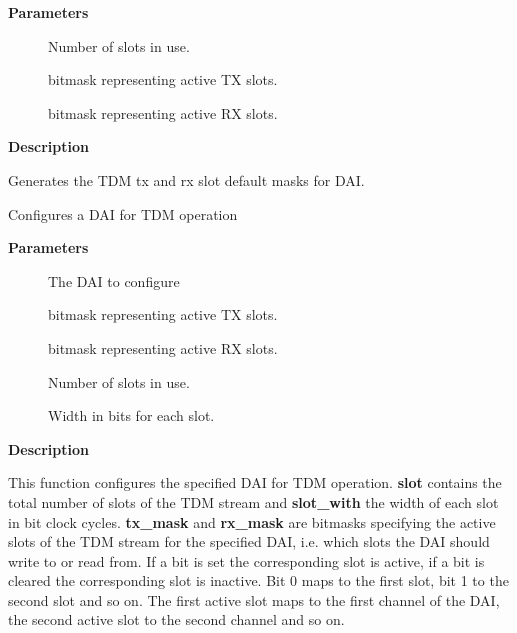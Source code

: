 \documentclass[a4paper,8pt,english]{sphinxmanual}
\begin{document}
\textbf{Parameters}
\begin{description}
\item[{}] \leavevmode
Number of slots in use.

\item[{}] \leavevmode
bitmask representing active TX slots.

\item[{}] \leavevmode
bitmask representing active RX slots.

\end{description}

\textbf{Description}

Generates the TDM tx and rx slot default masks for DAI.

\begin{fulllineitems}
\label{sound/kernel-api/alsa-driver-api:c.snd_soc_dai_set_tdm_slot}
Configures a DAI for TDM operation

\end{fulllineitems}


\textbf{Parameters}
\begin{description}
\item[{}] \leavevmode
The DAI to configure

\item[{}] \leavevmode
bitmask representing active TX slots.

\item[{}] \leavevmode
bitmask representing active RX slots.

\item[{}] \leavevmode
Number of slots in use.

\item[{}] \leavevmode
Width in bits for each slot.

\end{description}

\textbf{Description}

This function configures the specified DAI for TDM operation. \textbf{slot} contains
the total number of slots of the TDM stream and \textbf{slot\_with} the width of each
slot in bit clock cycles. \textbf{tx\_mask} and \textbf{rx\_mask} are bitmasks specifying the
active slots of the TDM stream for the specified DAI, i.e. which slots the
DAI should write to or read from. If a bit is set the corresponding slot is
active, if a bit is cleared the corresponding slot is inactive. Bit 0 maps to
the first slot, bit 1 to the second slot and so on. The first active slot
maps to the first channel of the DAI, the second active slot to the second
channel and so on.
\end{document}
